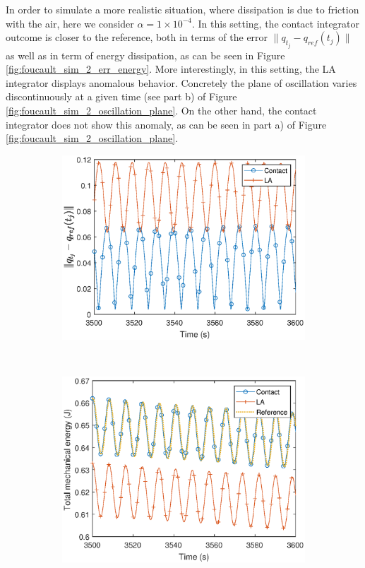 \documentclass{aims}
\numberwithin{equation}{section}
\theoremstyle{definition}
\begin{document}
\vskip 2mm
 In order to simulate a more realistic situation, where dissipation is due to friction with the air, here we consider $\alpha = 1\times 10^{-4}$. In this setting, the contact integrator outcome is closer to the reference, both in terms of the error $\|q_{t_j}-q_{ref}(t_j)\|$ as well as in term of energy dissipation, as can be seen in Figure \ref{fig:foucault_sim_2_err_energy}. More interestingly, in this setting, the LA integrator displays anomalous behavior. Concretely the plane of oscillation varies discontinuously at a given time (see part b) of Figure \ref{fig:foucault_sim_2_oscillation_plane}. On the other hand, the contact integrator does not show this anomaly, as can be seen in part a) of Figure \ref{fig:foucault_sim_2_oscillation_plane}.

\begin{figure}
  \centering
  \begin{subfigure}[b]{0.65\textwidth}
    \centering
    \includegraphics[width=\textwidth]{fig/err-alpha00001.eps}
  \end{subfigure} \\
  \begin{subfigure}[b]{0.65\textwidth}
    \centering
    \includegraphics[width=\textwidth]{fig/energia-alpha00001.eps}

\end{subfigure}
\end{figure}
\end{document}
